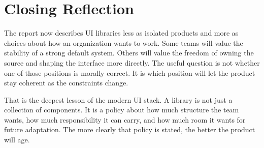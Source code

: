 \documentclass[11pt,twoside,a4paper]{article}
\begin{document}


\section{Closing Reflection}
The report now describes UI libraries less as isolated products and more as choices about how an organization wants to work. Some teams will value the stability of a strong default system. Others will value the freedom of owning the source and shaping the interface more directly. The useful question is not whether one of those positions is morally correct. It is which position will let the product stay coherent as the constraints change.

That is the deepest lesson of the modern UI stack. A library is not just a collection of components. It is a policy about how much structure the team wants, how much responsibility it can carry, and how much room it wants for future adaptation. The more clearly that policy is stated, the better the product will age.


\end{document}
